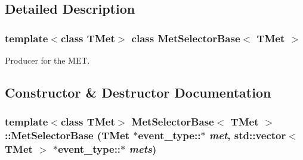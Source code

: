\subsection{Detailed Description}
\subsubsection*{template$<$class TMet$>$ class MetSelectorBase$<$ TMet $>$}

Producer for the MET. 

\subsection{Constructor \& Destructor Documentation}
\hypertarget{classMetSelectorBase_a373ff1e127345c9c14a16e19c358d63b}{
\subsubsection[{MetSelectorBase}]{\setlength{\rightskip}{0pt plus 5cm}template$<$class TMet$>$ {\bf MetSelectorBase}$<$ TMet $>$::{\bf MetSelectorBase} (TMet $\ast$event\_\-type::$\ast$ {\em met}, \/  std::vector$<$ TMet $>$ $\ast$event\_\-type::$\ast$ {\em mets})}}
\label{classMetSelectorBase_a373ff1e127345c9c14a16e19c358d63b}


